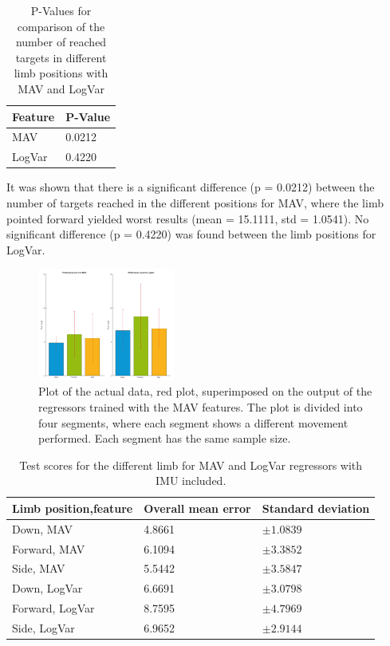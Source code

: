 	\begin{table}[!thpb]
		\begin{center}
			\begin{tabular}{l l}
				\hline
				\textbf{Feature} & \textbf{P-Value}\\
				\hline
				MAV & 0.0212 \\
				LogVar & 0.4220 \\
				\hline
			\end{tabular}
			\caption{P-Values for comparison of the number of reached targets in different limb positions with MAV and LogVar}
		\end{center}
	\end{table}
	
	It was shown that there is a significant difference (p = 0.0212) between the number of targets reached in the different positions for MAV, where the limb pointed forward yielded worst results (mean = 15.1111, std = 1.0541). No significant difference (p = 0.4220) was found between the limb positions for LogVar.
	
	\begin{figure}[!thpb]
		\centering
		\includegraphics[width=0.4\textwidth]{figures/GotItTimeIMU}  %
		\caption{Plot of the actual data, red plot, superimposed on the output of the regressors trained with the MAV features. The plot is divided into four segments, where each segment shows a different movement performed. Each segment has the same sample size.}
		\label{fig:GotItTimeIMU}  %
	\end{figure}
	
	\begin{table}[!thpb]
		\begin{center}
			\begin{tabular}{l l l}
				\hline
				\textbf{Limb position,feature} & \textbf{Overall mean error} & \textbf{Standard deviation}\\
				\hline
				Down, MAV & 4.8661 & $\pm 1.0839$ \\
				Forward, MAV & 6.1094 & $\pm 3.3852$ \\
				Side, MAV & 5.5442 & $\pm 3.5847$ \\
				Down, LogVar & 6.6691 & $\pm 3.0798$ \\
				Forward, LogVar & 8.7595 & $\pm 4.7969$ \\
				Side, LogVar & 6.9652 & $\pm 2.9144$ \\
				\hline
			\end{tabular}
			\caption{Test scores for the different limb for MAV and LogVar regressors with IMU included.}
		\end{center}
	\end{table}
	

